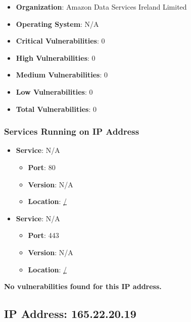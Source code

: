 \documentclass{article}
\begin{document}
\begin{itemize}
    \item \textbf{Organization}: Amazon Data Services Ireland Limited
    \item \textbf{Operating System}:  N/A 
    \item \textbf{Critical Vulnerabilities}: 0
    \item \textbf{High Vulnerabilities}: 0
    \item \textbf{Medium Vulnerabilities}: 0
    \item \textbf{Low Vulnerabilities}: 0
    \item \textbf{Total Vulnerabilities}: 0
\end{itemize}

\subsubsection*{Services Running on IP Address}

\begin{itemize}
    
        \item \textbf{Service}: N/A
        \begin{itemize}
            \item \textbf{Port}: 80
            \item \textbf{Version}:  N/A 
            \item \textbf{Location}: \href{ / }{ / }
        \end{itemize}
    
        \item \textbf{Service}: N/A
        \begin{itemize}
            \item \textbf{Port}: 443
            \item \textbf{Version}:  N/A 
            \item \textbf{Location}: \href{ / }{ / }
        \end{itemize}
    
\end{itemize}


\textbf{No vulnerabilities found for this IP address.}




\clearpage



\subsection{IP Address: 165.22.20.19}
\end{document}
